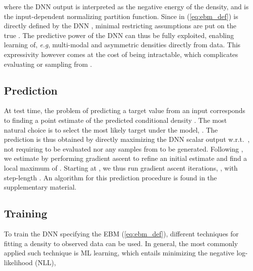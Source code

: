 \documentclass{bmvc2k}
\def\eg{\emph{e.g}\bmvaOneDot}
\begin{document}
where the DNN output  is interpreted as the negative energy of the density, and  is the input-dependent normalizing partition function. Since  in (\ref{eq:ebm_def}) is directly defined by the DNN , minimal restricting assumptions are put on the true . The predictive power of the DNN can thus be fully exploited, enabling learning of, \eg, multi-modal and asymmetric densities directly from data. This expressivity however comes at the cost of  being intractable, which complicates evaluating or sampling from . 






















\subsection{Prediction}
\label{section:ebms-prediction}
At test time, the problem of predicting a target value  from an input  corresponds to finding a point estimate of the predicted conditional density . The most natural choice is to select the most likely target under the model, . The prediction  is thus obtained by directly maximizing the DNN scalar output  w.r.t.\ , not requiring  to be evaluated nor any samples from  to be generated. Following \cite{gustafsson2019learning, danelljan2020probabilistic}, we estimate  by performing gradient ascent to refine an initial estimate  and find a local maximum of . Starting at , we thus run  gradient ascent iterations, , with step-length . An algorithm for this prediction procedure is found in the supplementary material.






















\subsection{Training}
\label{section:ebms-training}
To train the DNN  specifying the EBM (\ref{eq:ebm_def}), different techniques for fitting a density  to observed data  can be used. In general, the most commonly applied such technique is ML learning, which entails minimizing the negative log-likelihood (NLL), 
\end{document}
